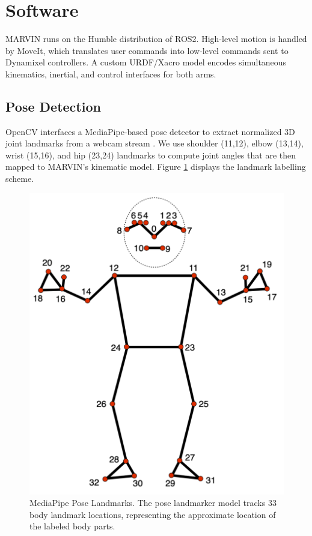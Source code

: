 \documentclass[manuscript,screen]{acmart} %
\begin{document}
\section{Software}
MARVIN runs on the Humble distribution of ROS2. High-level motion is handled by 
MoveIt, which translates user commands into low-level commands sent to Dynamixel 
controllers. A custom URDF/Xacro model encodes simultaneous kinematics, 
inertial, and control interfaces for both arms.

\subsection{Pose Detection}
OpenCV interfaces a MediaPipe-based pose detector to extract 
normalized 3D joint landmarks from a webcam stream \cite{noauthor_mediapipe_nodate}. 
We use shoulder (11,12), elbow (13,14), wrist (15,16), and hip 
(23,24) landmarks to compute joint angles that are then 
mapped to MARVIN's kinematic model. Figure \ref{fig:pose-landmarks}
displays the landmark labelling scheme.

\begin{figure}[htbp]
  \centering
  \includegraphics[width=0.5\linewidth]{assets/pose-landmarks.png}
  \caption{MediaPipe Pose Landmarks. The pose landmarker model tracks 33 body landmark locations, representing the approximate location of the labeled body parts.}
  \label{fig:pose-landmarks}
\end{figure}
\end{document}
